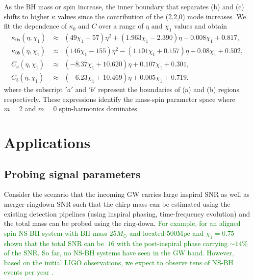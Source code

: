 \documentclass[preprint,onecolumn,,tightenlines,superscriptaddress,showpacs,nofootinbib,eqsecnum,amsfonts,amsmath]{revtex4}
\def\red#1{\textcolor{red}{#1}}
\def\green#1{\textcolor{green}{#1}}
\begin{document}
As the BH mass or spin increase, the inner boundary that separates (b) and (c)
shifts to higher $\kappa$ values since the contribution of the (2,2,0) mode
increases. We fit the dependence of $\kappa_{0}$ and $C$ over a range of
$\eta$ and $\chi_1$ values and obtain
\begin{eqnarray}
 \kappa_{0a}(\eta, \chi_{1})~ &\approx& (49\chi_{1} - 57) \eta^2 + (1.963{\chi_{1}}-2.390) \eta - 0.008{\chi_{1}} +0.817,\\
 \kappa_{0b}(\eta, \chi_{1})~ &\approx&  (146 \chi_{1} - 155) \eta^2 - (1.101 \chi_{1} + 0.157) \eta+ 0.08 {\chi_{1}}+0.502,\\
 C_{a}(\eta, \chi_{1}) &\approx &  (-8.37{\chi_{1}} + 10.620) \eta +  0.107 \chi_{1}+ 0.301,\\ 
 C_{b}(\eta, \chi_{1}) &\approx &  (-6.23{\chi_{1}} + 10.469) \eta +  0.005 \chi_{1}+ 0.719.
 \label{c_L_U}
\end{eqnarray}
where the subscript $'a'$ and $'b'$ represent the boundaries of (a) and (b)
regions respectively. These expressions identify the mass-spin parameter space
where $m=2$ and $m=0$ spin-harmonics dominates.
\section{Applications}
\label{IV}
\subsection{Probing signal parameters}
Consider the scenario that the incoming GW carries large inspiral SNR  as well as merger-ringdown SNR such that the chirp mass can be estimated using the existing detection pipelines (using inspiral phasing, time-frequency evolution) and the total mass can be probed using the ring-down. 
\green{For example, for an aligned  spin NS-BH system with BH mass $25M_\odot$ and located $500 \text{Mpc}$ and $\chi_1=0.75$  shown that the total SNR
can be $~16$ with the post-inspiral phase carrying  $\sim 14\%$ of the SNR. 
So far, no NS-BH systems have seen in the GW band. However, based on the initial LIGO observations, we expect to observe tens of  NS-BH events per year \cite{Abadie:2010cf,Abbott:2016ymx}.} %
\end{document}
